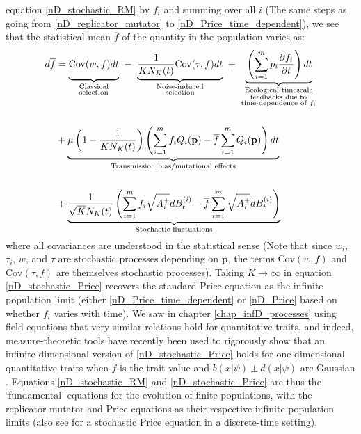 equation \eqref{nD_stochastic_RM} by $f_i$ and summing over all $i$ (The same steps as going from \eqref{nD_replicator_mutator} to \eqref{nD_Price_time_dependent}), we see that the statistical mean $\overline{f}$ of the quantity in the population varies as:
\begin{equation}
\label{nD_stochastic_Price}
\begin{aligned}
d\overline{f} &= {\underbrace{\vphantom{ \frac{1}{KN_K(t)} }\textrm{Cov}(w,f)dt}_{\substack{\text{Classical} \\ \text{selection}}}} \ - \ {\underbrace{\frac{1}{KN_K(t)}\textrm{Cov}(\tau,f)dt}_{\substack{\text{Noise-induced} \\ \text{selection}}}} \ +  \  {\underbrace{\vphantom{ \frac{1}{KN_K(t)} }\left(\sum\limits_{i=1}^{m}p_i\frac{\partial f_i}{\partial t}\right)dt}_{\substack{\text{Ecological timescale} \\ \text{feedbacks due to} \\ \text{time-dependence of $f_i$}}}}\\[15pt]
&+ \underbrace{\mu\left(1-\frac{1}{KN_K(t)}\right)\left(\sum\limits_{i=1}^{m}f_iQ_i(\mathbf{p}) - \overline{f}\sum\limits_{i=1}^{m}Q_i(\mathbf{p})\right)dt}_{\text{Transmission bias/mutational effects}}\\[15pt]
&+ \underbrace{\frac{1}{\sqrt{K}N_{K}(t)}\left(\sum\limits_{i=1}^{m}f_i\sqrt{A_i^+}dB_{t}^{(i)} - \overline{f}\sum\limits_{i=1}^{m}\sqrt{A_i^+}dB_{t}^{(i)}\right)}_{\text{Stochastic fluctuations}}
\end{aligned} 
\end{equation}
where all covariances are understood in the statistical sense (Note that since $w_i$, $\tau_i$, $\overline{w}$, and $\overline{\tau}$ are stochastic processes depending on $\mathbf{p}$, the terms $\textrm{Cov}(w,f)$ and $\textrm{Cov}(\tau,f)$ are themselves stochastic processes). Taking $K \to \infty$ in equation \eqref{nD_stochastic_Price} recovers the standard Price equation as the infinite population limit (either \eqref{nD_Price_time_dependent} or \eqref{nD_Price} based on whether $f_i$ varies with time). We saw in chapter \ref{chap_infD_processes} using field equations that very similar relations hold for quantitative traits, and indeed, measure-theoretic tools have recently been used to rigorously show that an infinite-dimensional version of \eqref{nD_stochastic_Price} holds for one-dimensional quantitative traits when $f$ is the trait value and $b(x|\psi) \pm d(x|\psi)$ are Gaussian \citep{week_white_2021}. Equations \eqref{nD_stochastic_RM} and \eqref{nD_stochastic_Price} are thus the `fundamental' equations for the evolution of finite populations, with the replicator-mutator and Price equations as their respective infinite population limits (also see \citep{rice_universal_2020} for a stochastic Price equation in a discrete-time setting).\\
